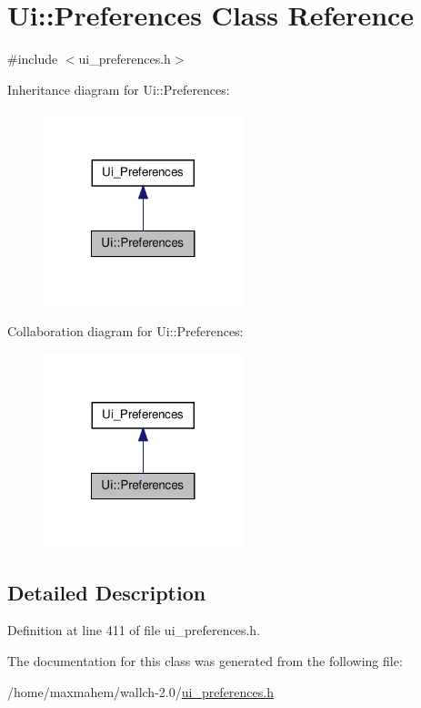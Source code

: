 \hypertarget{classUi_1_1Preferences}{
\section{Ui::Preferences Class Reference}
\label{classUi_1_1Preferences}
}


{\ttfamily \#include $<$ui\_\-preferences.h$>$}



Inheritance diagram for Ui::Preferences:
\nopagebreak
\begin{figure}[H]
\begin{center}
\leavevmode
\includegraphics[width=164pt]{classUi_1_1Preferences__inherit__graph}
\end{center}
\end{figure}


Collaboration diagram for Ui::Preferences:
\nopagebreak
\begin{figure}[H]
\begin{center}
\leavevmode
\includegraphics[width=164pt]{classUi_1_1Preferences__coll__graph}
\end{center}
\end{figure}


\subsection{Detailed Description}


Definition at line 411 of file ui\_\-preferences.h.



The documentation for this class was generated from the following file:\begin{DoxyCompactItemize}
\item 
/home/maxmahem/wallch-\/2.0/\hyperlink{ui__preferences_8h}{ui\_\-preferences.h}\end{DoxyCompactItemize}
